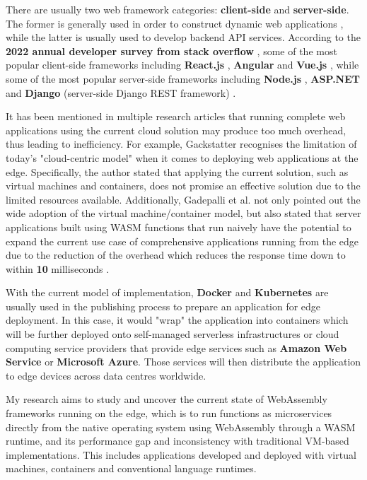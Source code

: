 There are usually two web framework categories: \textbf{client-side} and \textbf{server-side}. The former is generally used in order to construct dynamic web applications \cite{exp12}, while the latter is usually used to develop backend API services. According to the \textbf{2022 annual developer survey from stack overflow} \cite{exp20}, some of the most popular client-side frameworks including \textbf{React.js} \cite{exp13}, \textbf{Angular} \cite{exp14} and \textbf{Vue.js} \cite{exp15}, while some of the most popular server-side frameworks including \textbf{Node.js} \cite{exp16}, \textbf{ASP.NET} \cite{exp17} and \textbf{Django} \cite{exp18} (server-side Django REST framework) \cite{exp19}.

It has been mentioned in multiple research articles that running complete web applications using the current cloud solution may produce too much overhead, thus leading to inefficiency. For example, Gackstatter \cite{exp21} recognises the limitation of today's "cloud-centric model" when it comes to deploying web applications at the edge. Specifically, the author stated that applying the current solution, such as virtual machines and containers, does not promise an effective solution due to the limited resources available. Additionally, Gadepalli et al. not only pointed out the wide adoption of the virtual machine/container model, but also stated that server applications built using WASM functions that run naively have the potential to expand the current use case of comprehensive applications running from the edge due to the reduction of the overhead which reduces the response time down to within \textbf{10} milliseconds \cite{exp6}.

With the current model of implementation, \textbf{Docker} \cite{exp22} and \textbf{Kubernetes} \cite{exp23} are usually used in the publishing process to prepare an application for edge deployment. In this case, it would "wrap" the application into containers which will be further deployed onto self-managed serverless infrastructures or cloud computing service providers that provide edge services such as \textbf{Amazon Web Service} or \textbf{Microsoft Azure}. Those services will then distribute the application to edge devices across data centres worldwide.

My research aims to study and uncover the current state of WebAssembly frameworks running on the edge, which is to run functions as microservices directly from the native operating system using WebAssembly through a WASM runtime, and its performance gap and inconsistency with traditional VM-based implementations. This includes applications developed and deployed with virtual machines, containers and conventional language runtimes.

